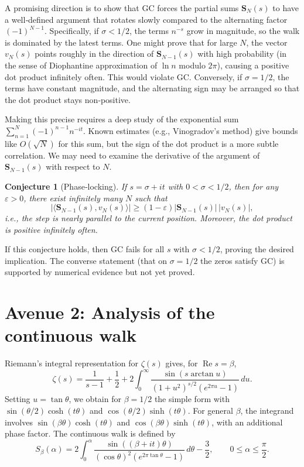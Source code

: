 \documentclass[11pt,a4paper]{article}
\newtheorem{conjecture}[theorem]{Conjecture}
\newcommand{\RE}{\operatorname{Re}}
\begin{document}
A promising direction is to show that GC forces the partial sums $\mathbf{S}_N(s)$ to have a well‑defined argument that rotates slowly compared to the alternating factor $(-1)^{N-1}$.  Specifically, if $\sigma < 1/2$, the terms $n^{-s}$ grow in magnitude, so the walk is dominated by the latest terms.  One might prove that for large $N$, the vector $v_N(s)$ points roughly in the direction of $\mathbf{S}_{N-1}(s)$ with high probability (in the sense of Diophantine approximation of $\ln n$ modulo $2\pi$), causing a positive dot product infinitely often.  This would violate GC.  Conversely, if $\sigma = 1/2$, the terms have constant magnitude, and the alternating sign may be arranged so that the dot product stays non‑positive.

Making this precise requires a deep study of the exponential sum $\sum_{n=1}^{N} (-1)^{n-1} n^{-it}$.  Known estimates (e.g., Vinogradov's method) give bounds like $O(\sqrt{N})$ for this sum, but the sign of the dot product is a more subtle correlation.  We may need to examine the derivative of the argument of $\mathbf{S}_{N-1}(s)$ with respect to $N$.

\begin{conjecture}[Phase‑locking]\label{conj:phase}
If $s = \sigma + it$ with $0 < \sigma < 1/2$, then for any $\varepsilon > 0$, there exist infinitely many $N$ such that
\[
|\langle\mathbf{S}_{N-1}(s), v_N(s)\rangle| \ge (1-\varepsilon) |\mathbf{S}_{N-1}(s)|\,|v_N(s)|,
\]
i.e., the step is nearly parallel to the current position.  Moreover, the dot product is positive infinitely often.
\end{conjecture}

If this conjecture holds, then GC fails for all $s$ with $\sigma < 1/2$, proving the desired implication.  The converse statement (that on $\sigma = 1/2$ the zeros satisfy GC) is supported by numerical evidence but not yet proved.

\section{Avenue 2: Analysis of the continuous walk}
\label{sec:continuous}

Riemann's integral representation for $\zeta(s)$ gives, for $\RE s = \beta$,
\[
\zeta(s) = \frac{1}{s-1} + \frac12 + 2 \int_{0}^{\infty} \frac{\sin(s \arctan u)}{(1+u^2)^{s/2} (e^{2\pi u}-1)} \,du .
\]
Setting $u = \tan\theta$, we obtain for $\beta = 1/2$ the simple form with $\sin(\theta/2)\cosh(t\theta)$ and $\cos(\theta/2)\sinh(t\theta)$.  For general $\beta$, the integrand involves $\sin(\beta\theta)\cosh(t\theta)$ and $\cos(\beta\theta)\sinh(t\theta)$, with an additional phase factor.  The continuous walk is defined by
\[
S_\beta(\alpha) = 2\int_{0}^{\alpha} \frac{\sin((\beta+it)\theta)}{(\cos\theta)^{2}(e^{2\pi\tan\theta}-1)} \,d\theta - \frac32,
\qquad 0 \le \alpha \le \frac{\pi}{2}.
\]
\end{document}
